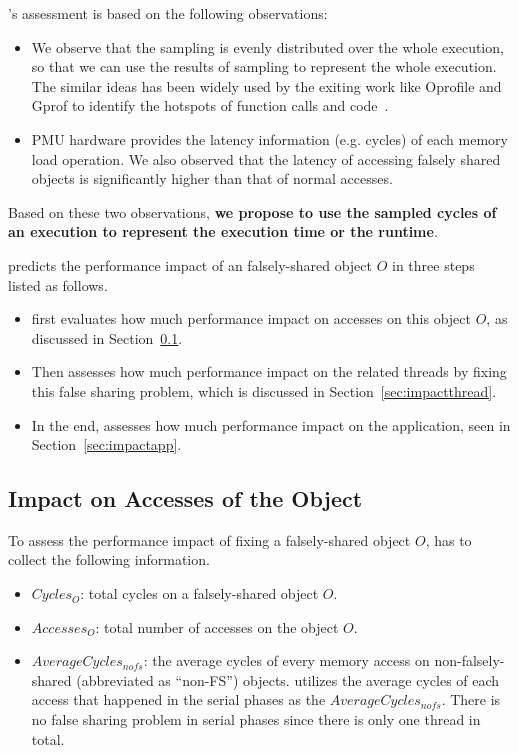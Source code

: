\cheetah{}'s assessment is based on the following observations:

\begin{itemize}
\item We observe that the sampling is evenly distributed over the whole execution, so that we can  use the results of sampling to represent the whole execution. The similar ideas has been widely used by the exiting work like Oprofile and Gprof to identify the hotspots of function calls and code~\cite{oprofile, DBLP:conf/sigplan/GrahamKM82}.

\item PMU hardware provides the latency information (e.g. cycles) of each memory load operation. We also observed that the latency of accessing falsely shared objects is significantly higher than that of normal accesses. 

\end{itemize}

Based on these two observations, {\bf we propose to use the sampled cycles of an execution to represent the execution time or the runtime}. 

\cheetah{} predicts the performance impact of an falsely-shared object $O$ in three steps listed as follows. 

\begin{itemize}
\item \cheetah{} first evaluates how much performance impact on accesses on this object $O$, as discussed in Section~\ref{sec:impactobject}. 

\item Then \cheetah{} assesses how much performance impact on the related threads by fixing this false sharing problem, which is discussed in Section~\ref{sec:impactthread}. 
 
\item In the end, \cheetah{} assesses how much performance impact on the application, seen in Section~\ref{sec:impactapp}. 
\end{itemize}


\subsection{Impact on Accesses of the Object}
\label{sec:impactobject}

To assess the performance impact of fixing a falsely-shared object $O$, \cheetah{} has to collect the following information. 
 
\begin{itemize}
\item $Cycles_O$: total cycles on a falsely-shared object $O$.
\item $Accesses_O$: total number of accesses on the object $O$.  
\item $AverageCycles_{nofs}$: the average cycles of every memory access on non-falsely-shared (abbreviated as ``non-FS'') objects. \cheetah{} utilizes the average cycles of each access that happened in the serial phases as the $AverageCycles_{nofs}$. There is no false sharing problem in serial phases since there is only one thread in total.  

\end{itemize}

